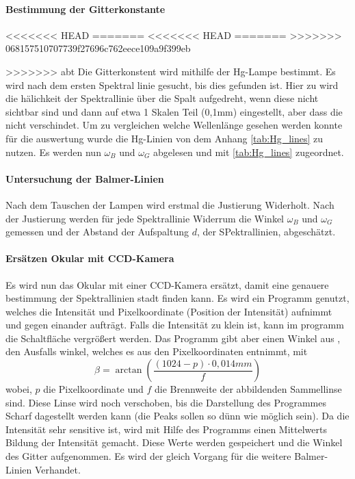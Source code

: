 \paragraph{Bestimmung der Gitterkonstante}
<<<<<<< HEAD
=======
<<<<<<< HEAD
=======
>>>>>>> 068157510707739f27696c762eece109a9f399eb

>>>>>>> abt
Die Gitterkonstent wird mithilfe der Hg-Lampe bestimmt.
Es wird nach dem ersten Spektral linie gesucht, bis dies gefunden ist. 
Hier zu wird die hälichkeit der Spektrallinie über die Spalt aufgedreht, wenn diese nicht sichtbar sind und dann auf etwa 1 Skalen Teil (0,1mm) eingestellt, aber dass die nicht verschindet.
Um zu vergleichen welche Wellenlänge gesehen werden konnte für die auswertung wurde die Hg-Linien von dem Anhang \cref{tab:Hg_lines} zu nutzen.
Es werden nun $\omega_B$ und $\omega_G$ abgelesen und mit \cref{tab:Hg_lines} zugeordnet.

\paragraph{Untersuchung der Balmer-Linien}
Nach dem Tauschen der Lampen wird erstmal die Justierung Widerholt. 
Nach der Justierung werden für jede Spektrallinie Widerrum die Winkel $\omega_B$ und $\omega_G$ gemessen und der Abstand der Aufspaltung $d$, der SPektrallinien, abgeschätzt.

\paragraph{Ersätzen Okular mit CCD-Kamera}
Es wird nun das Okular mit einer CCD-Kamera ersätzt, damit eine genauere bestimmung der Spektrallinien stadt finden kann. 
Es wird ein Programm genutzt, welches die Intensität und Pixelkoordinate (Position der Intensität) aufnimmt und gegen einander aufträgt. 
Falls die Intensität zu klein ist, kann im programm die Schaltfläche vergrößert werden.
Das Programm gibt aber einen Winkel aus , den Ausfalls winkel, welches es aus den Pixelkoordinaten entnimmt, mit 
\begin{equation}
    \beta = \arctan(\frac{(1024-p)\cdot0,014mm}{f})
\end{equation}
wobei, $p$ die Pixelkoordinate und $f$ die Brennweite der abbildenden Sammellinse sind.
Diese Linse wird noch verschoben, bis die Darstellung des Programmes Scharf dagestellt werden kann (die Peaks sollen so dünn wie möglich sein).
Da die Intensität sehr sensitive ist, wird mit Hilfe des Programms einen Mittelwerts Bildung der Intensität gemacht. 
Diese Werte werden gespeichert und die Winkel des Gitter aufgenommen. 
Es wird der gleich Vorgang für die weitere Balmer-Linien Verhandet.

